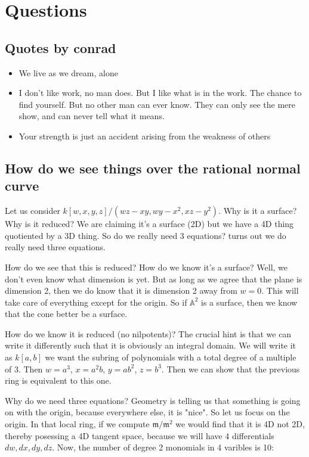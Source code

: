 \documentclass{book}
\newcommand{\A}{\ensuremath{\mathbb{A}}}
\newcommand{\m}{\mathfrak{m}}
\theoremstyle{definition}
\begin{document}
\section{Questions}
\subsection{Quotes by conrad}
\begin{itemize}
\item We live as we dream, alone
\item I don't like work, no man does. But I like what is in the work. The chance
     to find yourself. But no other man can ever know. They can only see the mere show,
      and can never tell what it means.
\item Your strength is just an accident arising from the weakness of others
\end{itemize}
\subsection{How do we see things over the rational normal curve}
Let us consider $k[w, x, y, z] / (wz - xy, wy - x^2, xz - y^2)$. Why is
it a surface? Why is it reduced? We are claiming it's a surface (2D)
but we have a 4D thing quotiented by a 3D thing. So do we really need 3 equations?
turns out we do really need three equations. 

How do we see that this is reduced? How do we know it's a surface? Well,
we don't even know what dimension is yet. But as long as we agree that
the plane is dimension 2, then we do know that it is dimension 2 away
from $w = 0$. This will take care of everything except for the origin. So if
$\A^2$ is a surface, then we know that the cone better be a surface.


How do we know it is reduced (no nilpotents)? The crucial hint  is that we can write
it differently such that it is obviously an integral domain. We will
write it as $k[a, b]$  we want the subring of polynomials with a total
degree of a multiple of $3$. Then $w = a^3$, $x = a^2 b$, $y = ab^2$, $z = b^3$.
Then we can show that the previous ring is equivalent to this one.

Why do we need three equations? Geometry is telling us that something is
going on with the origin, because everywhere else, it is "nice". So let
us focus on the origin. In that local ring, if we compute $\m/\m^2$ we would
find that it is 4D not 2D, thereby posessing a 4D tangent space, because
we will have 4 differentials $dw, dx, dy, dz$. Now, the number of degree
2 monomials in 4 varibles is 10:
\end{document}

